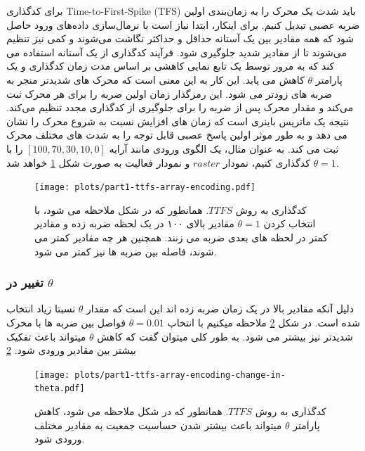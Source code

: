         برای کدگذاری 
        Time-to-First-Spike (TFS)
        باید شدت یک محرک را به زمان‌بندی اولین ضربه عصبی تبدیل کنیم. برای اینکار، ابتدا نیاز است با نرمال‌سازی داده‌های ورود حاصل شود که همه مقادیر بین یک آستانه حداقل و حداکثر نگاشت می‌شوند و کمی نیز تنظیم می‌شوند تا از مقادیر شدید جلوگیری شود. فرآیند کدگذاری از یک آستانه استفاده می کند که به مرور توسط یک تابع نمایی کاهشی بر اساس مدت زمان کدگذاری و یک پارامتر
        $\theta$
        کاهش می یابد. این کار به این معنی است که محرک های شدیدتر منجر به ضربه های زودتر می شود. این رمزگذار زمان اولین ضربه را برای هر محرک ثبت می‌کند و مقدار محرک پس از ضربه را برای جلوگیری از کدگذاری مجدد تنظیم می‌کند. نتیجه یک ماتریس باینری است که زمان های افزایش نسبت به شروع محرک را نشان می دهد و به طور موثر اولین پاسخ عصبی قابل توجه را به شدت های مختلف محرک ثبت می کند. به عنوان مثال، یک الگوی ورودی مانند آرایه
        $[100, 70, 30, 10, 0]$
        را با 
        $\theta=1$ 
        کدگذاری کنیم، نمودار 
        $raster$ 
        و نمودار فعالیت به صورت شکل 
        \ref{fig:part1-ttfs-array-encoding}
        خواهد شد.
        \begin{figure}[!ht]
            \centering
            \texttt{[image: plots/part1-ttfs-array-encoding.pdf]} 
            \caption{کدگذاری به روش 
            $TTFS$. 
            همانطور که در شکل ملاحظه می شود، با انتخاب کردن 
            $\theta=1$ 
            مقادیر بالای ۱۰۰ در یک لحظه ضربه زده و مقادیر  کمتر در لحظه های بعدی ضربه می زنند. همچنین هر چه مقادیر کمتر می شوند، فاصله بین ضربه ها نیز کمتر می شود.}
            \label{fig:part1-ttfs-array-encoding}
        \end{figure}
        \subsubsection*{تغییر در $\theta$}
        دلیل آنکه مقادیر بالا در یک زمان ضربه زده اند این است که مقدار 
        $\theta$ 
        نسبتا زیاد انتخاب شده است. در شکل 
        \ref{fig:part1-ttfs-array-encoding-change-in-theta}
        ملاحظه میکنیم با انتخاب 
        $\theta=0.01$ 
        فواصل بین ضربه ها با محرک شدیدتر نیز بیشتر می شود. به طور کلی میتوان گفت که کاهش 
        $\theta$ 
        میتواند باعث تفکیک بیشتر بین مقادیر ورودی شود.
        \ref{fig:part1-ttfs-array-encoding-change-in-theta}
        \begin{figure}[!ht]
            \centering
            \texttt{[image: plots/part1-ttfs-array-encoding-change-in-theta.pdf]} 
            \caption{کدگذاری به روش 
            $TTFS$. 
            همانطور که در شکل ملاحظه می شود، کاهش پارامتر 
            $\theta$ 
            میتواند باعث بیشتر شدن حساسیت جمعیت به مقادیر مختلف ورودی شود.}
            \label{fig:part1-ttfs-array-encoding-change-in-theta}
        \end{figure}


